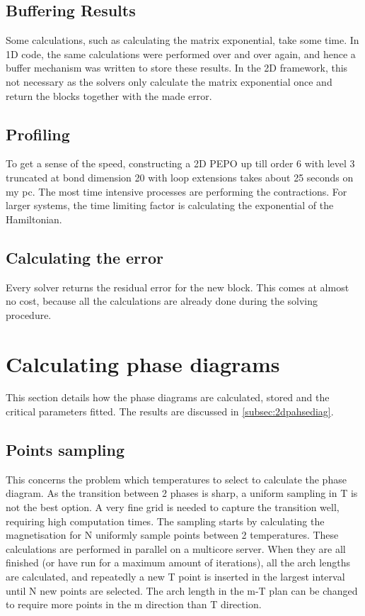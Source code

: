 \subsection{Buffering Results}

Some calculations, such as calculating the matrix exponential, take some time. In 1D code, the same calculations were performed over and over again, and hence a buffer mechanism was written to store these results. In the 2D framework, this not necessary as the solvers only calculate the matrix exponential once and return the blocks together with the made error.

\subsection{Profiling}
To get a sense of the speed, constructing a 2D PEPO up till order 6 with level 3 truncated at bond dimension 20 with loop extensions takes about 25 seconds on my pc. The most time intensive processes are performing the contractions. For larger systems, the time limiting factor is calculating the exponential of the Hamiltonian.

\subsection{Calculating the error}

Every solver returns the residual error for the new block. This comes at almost no cost, because all the calculations are already done during the solving procedure.

\section{Calculating phase diagrams} \label{sec:phase_diag}

This section details how the phase diagrams are calculated, stored and the critical parameters fitted. The results are discussed in \cref{subsec:2dpahsediag}.

\subsection{Points sampling}

This concerns the problem which temperatures to select to calculate the phase diagram. As  the transition between 2 phases is sharp, a uniform sampling in T is not the best option. A very fine grid is needed to capture the transition well, requiring high computation times.
The sampling starts by calculating the magnetisation for N  uniformly sample points between 2 temperatures. These calculations are performed in parallel on a multicore server. When they are all finished (or have run for a maximum amount of iterations), all the arch lengths are calculated, and repeatedly a new T point is inserted in the largest interval until N new points are selected. The arch length in the m-T plan can be changed to require more points in the m direction than T direction.

